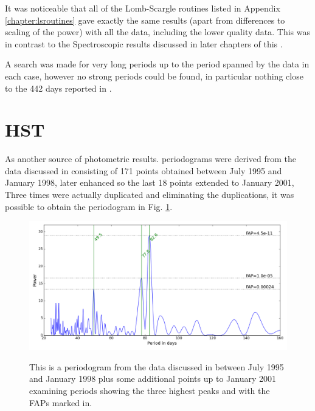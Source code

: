 It was noticeable that all of the Lomb-Scargle routines listed in Appendix \ref{chapter:lsroutines} gave exactly
the same results (apart from differences to scaling of the power) with all the {\asas} data, including the lower quality
data. This was in contrast to the Spectroscopic results discussed in later chapters of this \paperorthesis.

A search was made for very long periods up to the period spanned by the data in each case, however no strong periods
could be found, in particular nothing close to the 442 days reported in \citet{cincunegui07}.

\section{HST}
\protect\label{section:hst}

As another source of photometric results. periodograms were derived from the  {\hst} data discussed in
\citealt{benedict92,benedict98} consisting of 171 points obtained between July 1995 and January 1998, later enhanced so
the last 18 points extended to January 2001, Three times were actually duplicated and eliminating the duplications, it
was possible to obtain the periodogram in Fig. \ref{fig:hstb4min}.

\begin{figure}[!htbp]
\begin{center}
\includegraphics[scale=0.50]{Figures/hstb4min.png} \\
\end{center}
\caption{This is a periodogram from the {\hst} data discussed in \citet{benedict98} between July 1995 and January 1998 plus some additional
  points up to January 2001 examining periods showing the three highest peaks and with the FAPs marked in.}
\protect\label{fig:hstb4min}
\end{figure}

